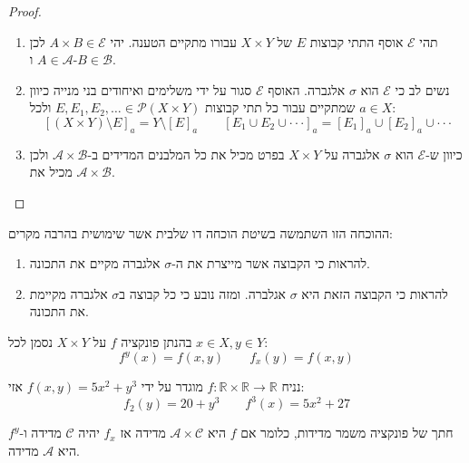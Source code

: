 \documentclass{tstextbook}
\begin{document}
\begin{proof}
  \begin{enumerate}
    \item תהי \(\mathcal{E}\) אוסף התתי קבוצות \(E\) של \(X \times Y\) עבורו מתקיים הטענה. יהי \(A\times B \in \mathcal{E}\) לכן \(A \in \mathcal{A}\) ו-\(B \in \mathcal{B}\). 


    \item נשים לב כי \(\mathcal{E}\) הוא \(\sigma\) אלגברה. האוסף \(\mathcal{E}\) סגור על ידי משלימים ואיחודים בני מנייה כיוון שמתקיים עבור כל תתי קבוצות \(E,E_{1},E_{2},\dots \in \mathcal{P}\left( X\times Y \right)\) ולכל \(a \in X\): 
$$\left[ \left( X\times Y \right)\setminus E \right]_{a}=Y\setminus[E]_{a}\qquad \left[ E_{1}\cup E_{2}\cup\cdot\cdot\cdot \right]_{a}=[E_{1}]_{a}\cup[E_{2}]_{a}\cup\cdot\cdot\cdot$$


    \item כיוון ש-\(\mathcal{E}\) הוא \(\sigma\) אלגברה על \(X \times Y\) בפרט מכיל את כל המלבנים המדידים ב-\(\mathcal{A}\times \mathcal{B}\) ולכן מכיל את \(\mathcal{A}\times \mathcal{B}\). 


  \end{enumerate}
\end{proof}
\begin{remark}
ההוכחה הזו השתמשה בשיטת הוכחה דו שלבית אשר שימושית בהרבה מקרים:

  \begin{enumerate}
    \item להראות כי הקבוצה אשר מייצרת את ה-\(\sigma\) אלגברה מקיים את התכונה. 


    \item להראות כי הקבוצה הזאת היא \(\sigma\) אגלברה. 
ומזה נובע כי כל קבוצה ב\(\sigma\) אלגברה מקיימת את התכונה.


  \end{enumerate}
\end{remark}
\begin{definition}
בהנתן פונקציה \(f\) על \(X \times Y\) נסמן לכל \(x \in X, y \in Y\):
$$f^{y}(x)=f(x,y)\qquad f_{x}(y)=f(x,y)$$

\end{definition}
\begin{example}
נניח \(f:\mathbb{R}\times \mathbb{R}\to \mathbb{R}\) מוגדר על ידי \(f(x,y)=5x^{2}+y^{3}\) אזי:
$$f_{2}(y)=20+y^{3}\qquad f^{3}(x)=5x^{2}+27$$

\end{example}
\begin{proposition}
חתך של פונקציה משמר מדידות, כלומר אם \(f\) היא \(\mathcal{A}\times \mathcal{C}\) מדידה אז \(f_{x}\) יהיה \(\mathcal{C}\) מדידה ו-\(f^{y}\) היא \(\mathcal{A}\) מדידה.

\end{proposition}
\end{document}

